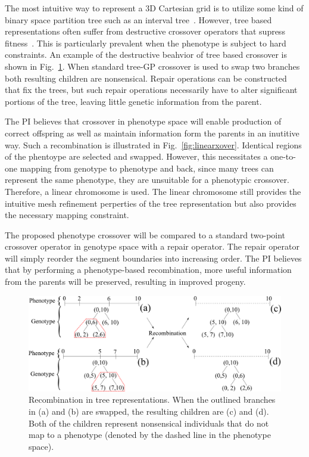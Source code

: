 \documentclass{article}
\begin{document}
The most intuitive way to represent a 3D Cartesian grid is to utilize some kind of binary space partition tree such as an interval tree~\cite{ref:Franco1985}. However, tree based representations often suffer from destructive crossover operators that supress fitness~\cite{ref:Sheneman2006}. This is particularly prevalent when the phenotype is subject to hard constraints. An example of the destructive beahvior of tree based crossover is shown in Fig.~\ref{fig:treefail}. When standard tree-GP crossover is used to swap two branches both resulting children are nonsensical. Repair operations can be constructed that fix the trees, but such repair operations necessarily have to alter significant portions of the tree, leaving little genetic information from the parent.

The PI believes that crossover in phenotype space will enable production of correct offspring as well as maintain information form the parents in an inutitive way. Such a recombination is illustrated in Fig.~\ref{fig:linearxover}. Identical regions of the phentoype are selected and swapped. However, this necessitates a one-to-one mapping from genotype to phenotype and back, since many trees can represent the same phenotype, they are unsuitable for a phenotypic crossover. Therefore, a linear chromosome is used. The linear chromosome still provides the intuitive mesh refinement perperties of the tree representation but also provides the necessary mapping constraint.

The proposed phenotype crossover will be compared to a standard two-point crossover operator in genotype space with a repair operator. The repair operator will simply reorder the segment boundaries into increasing order. The PI believes that by performing a phenotype-based recombination, more useful information from the parents will be preserved, resulting in improved progeny.
\begin{figure}
    \centering
    \includegraphics[width=\textwidth]{treefail}
    \caption{Recombination in tree representations. When the outlined branches in (a) and (b) are swapped, the resulting children are (c) and (d). Both of the children represent nonsensical individuals that do not map to a phenotype (denoted by the dashed line in the phenotype space).}
    \label{fig:treefail}
\end{figure}
\end{document}
